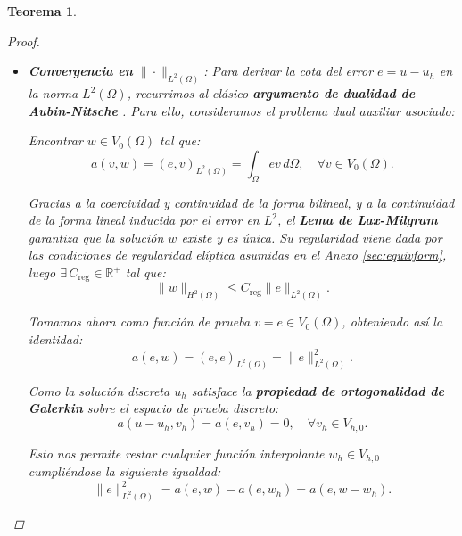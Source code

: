 \documentclass[11pt]{book}
\theoremstyle{plain} %
\newtheorem{teorema}{Teorema}[chapter]
\theoremstyle{definition} %
\theoremstyle{definition} %
\begin{document}
\begin{teorema}
\begin{proof}
\begin{itemize}
    Finalmente, definiendo $C_1 = C_{\text{Céa}}C_{\text{Sob}}$, el error en $H^1(\Omega)$ converge con orden $\mathcal{O}(h^{p})$ siempre que $u\in H^{p+1}(\Omega)$:
    \begin{equation*}
        \|u - u_h\|_{H^1(\Omega)} \leq C_1 h^{p} \|u\|_{H^{p+1}(\Omega)}.
    \end{equation*}

    \item \textbf{Convergencia en } $\|\cdot\|_{L^2(\Omega)}$:
    \label{anexo:L2_general}
    Para derivar la cota del error $e=u-u_h$ en la norma $L^2(\Omega)$, recurrimos al clásico \textbf{argumento de dualidad de Aubin-Nitsche} \cite{ciarlet_finite_2002}. Para ello, consideramos el problema dual auxiliar asociado:

    Encontrar $w\in V_0(\Omega)$ tal que:
    \begin{equation*}
        a(v,w) = (e,v)_{L^2(\Omega)}=\int_\Omega ev \, d\Omega, \quad \forall v \in V_0(\Omega).
    \end{equation*}

    Gracias a la coercividad y continuidad de la forma bilineal, y a la continuidad de la forma lineal inducida por el error en $L^2$, el \textbf{Lema de Lax-Milgram} garantiza que la solución $w$ existe y es única. Su regularidad viene dada por las condiciones de regularidad elíptica asumidas en el Anexo \ref{sec:equivform}, luego $\exists \, C_{\text{reg}}\in \mathbb{R}^+$ tal que:
    \begin{equation}
        \label{eq:Lax-Millgram}
        \|w\|_{H^2(\Omega)} \leq C_{\text{reg}} \|e\|_{L^2(\Omega)}.
    \end{equation}

    Tomamos ahora como función de prueba $v=e \in V_0(\Omega)$, obteniendo así la identidad:
    \begin{equation*}
        a(e,w) = (e,e)_{L^2(\Omega)}=\|e\|^2_{L^2(\Omega)}.
    \end{equation*}

    Como la solución discreta $u_h$ satisface la \textbf{propiedad de ortogonalidad de Galerkin} sobre el espacio de prueba discreto:
    \begin{equation*}
        a(u-u_h, v_h) = a(e, v_h) = 0, \quad \forall v_h \in V_{h,0}.
    \end{equation*} 

    Esto nos permite restar cualquier función interpolante $w_h \in V_{h,0}$ cumpliéndose la siguiente igualdad:
    \begin{equation*}
        \|e\|_{L^2(\Omega)}^2 = a(e, w) - a(e, w_h) = a(e, w - w_h).
    \end{equation*}


\end{itemize}
\end{proof}
\end{teorema}
\end{document}
